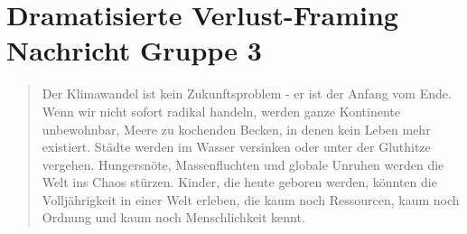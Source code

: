 \documentclass[12pt,twoside=off,
bibtotoc,liststotoc,appendixprefix,paper=a4,headings=small]{scrbook} %
\begin{document}
\section{Dramatisierte Verlust-Framing Nachricht Gruppe 3}\label{app:messages:drama}
\begin{quote}
  Der Klimawandel ist kein Zukunftsproblem - er ist der Anfang vom Ende. Wenn wir nicht sofort radikal handeln, werden ganze Kontinente unbewohnbar, Meere zu kochenden Becken, in denen kein Leben mehr existiert. Städte werden im Wasser versinken oder unter der Gluthitze vergehen. Hungersnöte, Massenfluchten und globale Unruhen werden die Welt ins Chaos stürzen. Kinder, die heute geboren werden, könnten die Volljährigkeit in einer Welt erleben, die kaum noch Ressourcen, kaum noch Ordnung und kaum noch Menschlichkeit kennt.

\end{quote}
\end{document}
